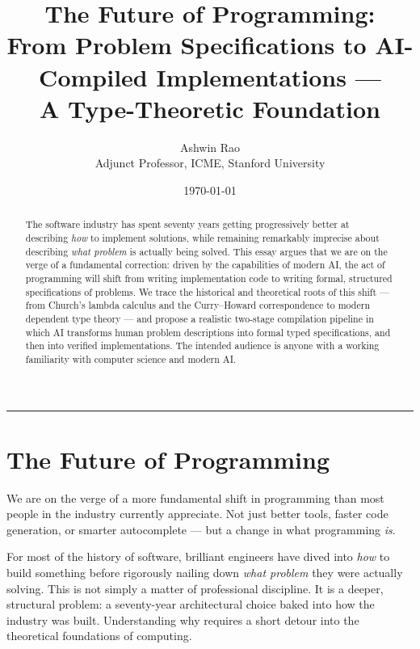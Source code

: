 \documentclass[12pt]{article}
\title{%
  \vspace{-1cm}
  \LARGE\bfseries The Future of Programming:\\[0.4em]
  \large From Problem Specifications to AI-Compiled Implementations ---\\
  A Type-Theoretic Foundation
}
\author{Ashwin Rao\\
  \small 
  Adjunct Professor, ICME, Stanford University
}
\date{\today}
\begin{document}
\maketitle
\vspace{0.5em}
\hrule
\vspace{1.2em}

\begin{abstract}
The software industry has spent seventy years getting progressively better at
describing \emph{how} to implement solutions, while remaining remarkably
imprecise about describing \emph{what problem} is actually being solved. This
essay argues that we are on the verge of a fundamental correction: driven by
the capabilities of modern AI, the act of programming will shift from writing
implementation code to writing formal, structured specifications of problems.
We trace the historical and theoretical roots of this shift --- from Church's
lambda calculus and the Curry--Howard correspondence to modern dependent type
theory --- and propose a realistic two-stage compilation pipeline in which AI
transforms human problem descriptions into formal typed specifications, and
then into verified implementations. The intended audience is anyone with a
working familiarity with computer science and modern AI.
\end{abstract}

\vspace{0.8em}

\section{The Future of Programming}

We are on the verge of a more fundamental shift in programming than most
people in the industry currently appreciate. Not just better tools, faster
code generation, or smarter autocomplete --- but a change in what programming
\emph{is}.

For most of the history of software, brilliant engineers have dived into
\emph{how} to build something before rigorously nailing down \emph{what
problem} they were actually solving. This is not simply a matter of
professional discipline. It is a deeper, structural problem: a seventy-year
architectural choice baked into how the industry was built. Understanding why
requires a short detour into the theoretical foundations of computing.

\end{document}
